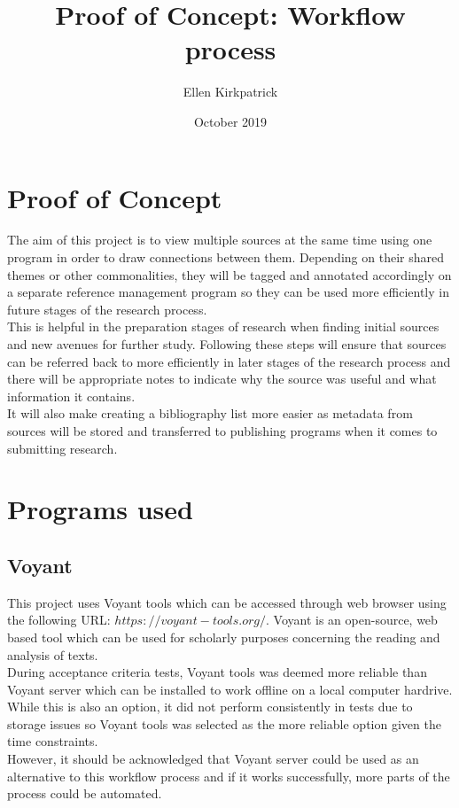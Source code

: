 \documentclass{article}
\title{Proof of Concept: Workflow process}
\author{Ellen Kirkpatrick }
\date{October 2019}
\begin{document}
\maketitle

\section{Proof of Concept}
The aim of this project is to view multiple sources at the same time using one program in order to draw connections between them. Depending on their shared themes or other commonalities, they will be tagged and annotated accordingly on a separate reference management program so they can be used more efficiently in future stages of the research process.\\
This is helpful in the preparation stages of research when finding initial sources and new avenues for further study. Following these steps will ensure that sources can be referred back to more efficiently in later stages of the research process and there will be appropriate notes to indicate why the source was useful and what information it contains.\\
It will also make creating a bibliography list more easier as metadata from sources will be stored and transferred to publishing programs when it comes to submitting research.

\section{Programs used}
\subsection{Voyant}
This project uses Voyant tools which can be accessed through web browser using the following URL: $https://voyant-tools.org/.$ Voyant is an open-source, web based tool which can be used for scholarly purposes concerning the reading and analysis of texts.\\
During acceptance criteria tests, Voyant tools was deemed more reliable than Voyant server which can be installed to work offline on a local computer hardrive. While this is also an option, it did not perform consistently in tests due to storage issues so Voyant tools was selected as the more reliable option given the time constraints.\\
However, it should be acknowledged that Voyant server could be used as an alternative to this workflow process and if it works successfully, more parts of the process could be automated.
\end{document}
